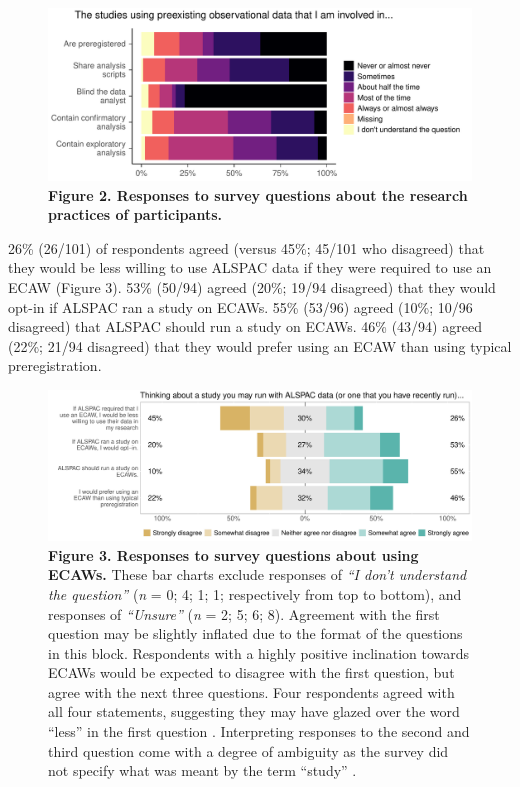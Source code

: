 \documentclass[
  man,floatsintext]{apa6}
\begin{document}
\begin{figure}

{\centering \includegraphics[width=1\linewidth]{figs/methodPlot-1} 

}

\caption{\textbf{Figure 2. Responses to survey questions about the research practices of participants.}}\label{fig:methodPlot}
\end{figure}



26\% (26/101) of respondents agreed (versus 45\%; 45/101 who disagreed) that they would be less willing to use ALSPAC data if they were required to use an ECAW (Figure 3). 53\% (50/94) agreed (20\%; 19/94 disagreed) that they would opt-in if ALSPAC ran a study on ECAWs. 55\% (53/96) agreed (10\%; 10/96 disagreed) that ALSPAC should run a study on ECAWs. 46\% (43/94) agreed (22\%; 21/94 disagreed) that they would prefer using an ECAW than using typical preregistration.

\begin{figure}

{\centering \includegraphics[width=1\linewidth]{figs/alspacPlot-1} 

}

\caption{\textbf{Figure 3. Responses to survey questions about using ECAWs.} These bar charts exclude responses of \emph{``I don't understand the question''} (\emph{n} = 0; 4; 1; 1; respectively from top to bottom), and responses of \emph{``Unsure''} (\emph{n} = 2; 5; 6; 8). Agreement with the first question may be slightly inflated due to the format of the questions in this block. Respondents with a highly positive inclination towards ECAWs would be expected to disagree with the first question, but agree with the next three questions. Four respondents agreed with all four statements, suggesting they may have glazed over the word ``less'' in the first question \protect\footnotemark[3]. Interpreting responses to the second and third question come with a degree of ambiguity as the survey did not specify what was meant by the term ``study'' \protect\footnotemark[4].}\label{fig:alspacPlot}
\end{figure}
\end{document}
